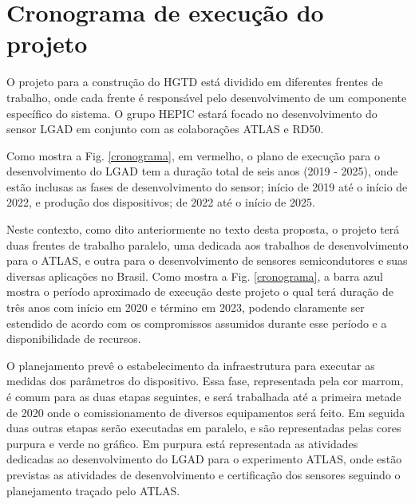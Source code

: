\chapter{Cronograma de execução do projeto}

O projeto para a construção do HGTD está dividido em diferentes frentes de trabalho, onde cada frente é responsável pelo desenvolvimento de um componente específico do sistema. O grupo HEPIC estará focado no desenvolvimento do sensor LGAD em conjunto com as colaborações ATLAS e RD50. 


Como mostra a Fig. \ref{cronograma}, em vermelho, o plano de execução para o desenvolvimento do LGAD tem a duração total de seis anos (2019 - 2025), onde estão inclusas as fases de desenvolvimento do sensor; início de 2019 até o início de 2022, e produção dos dispositivos; de 2022 até o início de 2025. 

Neste contexto, como dito anteriormente no texto desta proposta, o projeto terá duas frentes de trabalho paralelo, uma dedicada aos trabalhos de desenvolvimento para o ATLAS, e outra para o desenvolvimento de sensores semicondutores e suas diversas aplicações no Brasil. Como mostra a Fig. \ref{cronograma}, a barra azul mostra o período aproximado de execução deste projeto o qual terá duração de três anos com início em 2020 e término em 2023, podendo claramente ser estendido de acordo com os compromissos assumidos durante esse período e a disponibilidade de recursos.

O planejamento prevê o estabelecimento da infraestrutura para executar as medidas dos parâmetros do dispositivo. Essa fase, representada pela cor marrom, é comum para as duas etapas seguintes, e será trabalhada até a primeira metade de 2020 onde o comissionamento de diversos equipamentos será feito. Em seguida duas outras etapas serão executadas em paralelo, e são representadas pelas cores purpura e verde no gráfico. Em purpura está representada as atividades dedicadas ao desenvolvimento do LGAD para o experimento ATLAS, onde estão previstas as atividades de desenvolvimento e certificação dos sensores seguindo o planejamento traçado pelo ATLAS.

